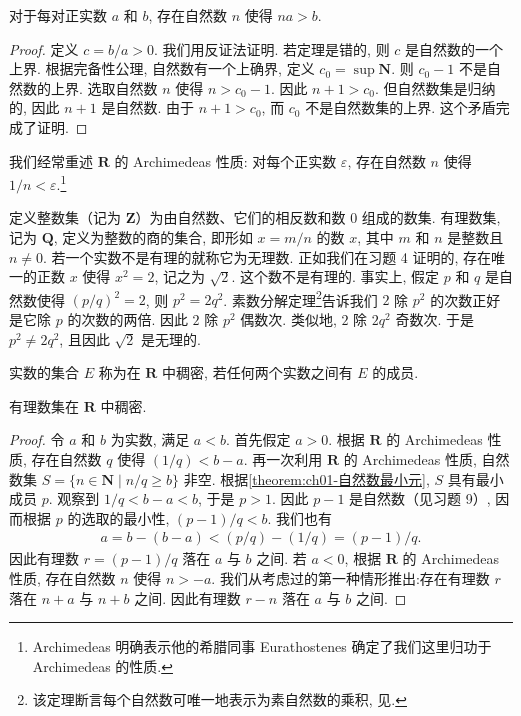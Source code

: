 \documentclass[../../main.tex]{subfiles}
\begin{document}
\begin{proposition}[Archimedeas 性质]\label{proposition:ch01-Archimedeas}
对于每对正实数 $a$ 和 $b$, 存在自然数 $n$ 使得 $na>b$.
\end{proposition}

\begin{proof}
定义 $c=b/a>0$. 我们用反证法证明. 若定理是错的, 则 $c$ 是自然数的一个上界. 根据完备性公理, 自然数有一个上确界, 定义 $c_{0}=\sup\mathbf{N}$. 则 $c_{0}-1$ 不是自然数的上界. 选取自然数 $n$ 使得 $n>c_{0}-1$. 因此 $n+1>c_{0}$. 但自然数集是归纳的, 因此 $n+1$ 是自然数. 由于 $n+1>c_{0}$, 而 $c_{0}$ 不是自然数集的上界. 这个矛盾完成了证明.
\end{proof}

我们经常重述 $\mathbf{R}$ 的 Archimedeas 性质: 对每个正实数 $\varepsilon$, 存在自然数 $n$ 使得 $1/n<\varepsilon$.\footnote{Archimedeas 明确表示他的希腊同事 Eurathostenes 确定了我们这里归功于 Archimedeas 的性质.}

定义整数集（记为 $\mathbf{Z}$）为由自然数、它们的相反数和数 $0$ 组成的数集. 有理数集, 记为 $\mathbf{Q}$, 定义为整数的商的集合, 即形如 $x=m/n$ 的数 $x$, 其中 $m$ 和 $n$ 是整数且 $n\neq 0$. 若一个实数不是有理的就称它为无理数. 正如我们在习题 4 证明的, 存在唯一的正数 $x$ 使得 $x^{2}=2$, 记之为 $\sqrt{2}$. 这个数不是有理的. 事实上, 假定 $p$ 和 $q$ 是自然数使得 $(p/q)^{2}=2$, 则 $p^{2}=2q^{2}$. 素数分解定理\footnote{该定理断言每个自然数可唯一地表示为素自然数的乘积, 见\cite{BM97}.}告诉我们 $2$ 除 $p^{2}$ 的次数正好是它除 $p$ 的次数的两倍. 因此 $2$ 除 $p^{2}$ 偶数次. 类似地, $2$ 除 $2q^{2}$ 奇数次. 于是 $p^{2}\neq 2q^{2}$, 且因此 $\sqrt{2}$ 是无理的.

\begin{definition}\label{definition:ch01-稠密}
实数的集合 $E$ 称为在 $\mathbf{R}$ 中稠密, 若任何两个实数之间有 $E$ 的成员.
\end{definition}

\begin{theorem}\label{theorem:ch01-有理数稠密}
有理数集在 $\mathbf{R}$ 中稠密.
\end{theorem}

\begin{proof}
令 $a$ 和 $b$ 为实数, 满足 $a<b$. 首先假定 $a>0$. 根据 $\mathbf{R}$ 的 Archimedeas 性质, 存在自然数 $q$ 使得 $(1/q)<b-a$. 再一次利用 $\mathbf{R}$ 的 Archimedeas 性质, 自然数集 $S=\{n\in\mathbf{N}\mid n/q\geqslant b\}$ 非空. 根据\cref{theorem:ch01-自然数最小元}, $S$ 具有最小成员 $p$. 观察到 $1/q<b-a<b$, 于是 $p>1$. 因此 $p-1$ 是自然数（见习题 9）, 因而根据 $p$ 的选取的最小性, $(p-1)/q<b$. 我们也有
\begin{align*}
a=b-(b-a)<(p/q)-(1/q)=(p-1)/q.
\end{align*}
因此有理数 $r=(p-1)/q$ 落在 $a$ 与 $b$ 之间. 若 $a<0$, 根据 $\mathbf{R}$ 的 Archimedeas 性质, 存在自然数 $n$ 使得 $n>-a$. 我们从考虑过的第一种情形推出:存在有理数 $r$ 落在 $n+a$ 与 $n+b$ 之间. 因此有理数 $r-n$ 落在 $a$ 与 $b$ 之间.
\end{proof}
\end{document}
